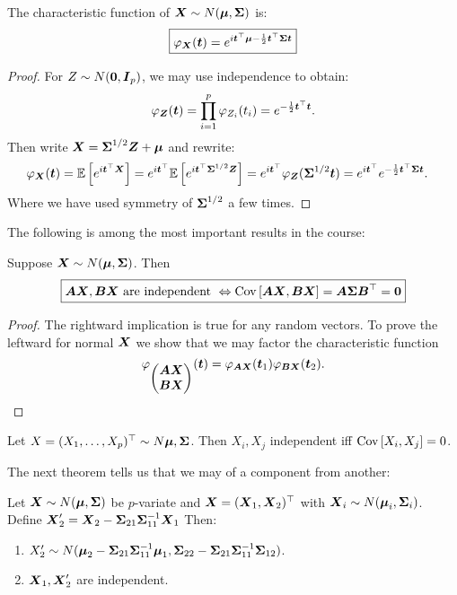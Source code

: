 \begin{theorem}
    The characteristic function of $\X\sim N(\M, \SS)$ is:
    \begin{equation}
        \boxed{\phi_{\X}(\mt) = e^{ i \mt^\top\M - \frac{1}{2}\mt^\top\SS\mt}}
    \end{equation}
\end{theorem}
\begin{proof}
    For $Z\sim N(\zero, \mI_p)$, we may use independence to obtain:
    $$
        \phi_{\Z}(\mt) = \prod_{i=1}^p \phi_{Z_i}(t_i) = e^{-\frac{1}{2} \mt^\top\mt}.
    $$
    Then write $\X=\SS^{1/2} \Z + \M$ and rewrite:
    \begin{align*}
        \phi_{\X}(\mt) 
        &= \ev{e^{i\mt^\top\X}}
        = e^{i\mt^\top}\ev{e^{i\mt^\top\SS^{1/2}\Z}}
        = e^{i\mt^\top}\phi_{\Z}(\SS^{1/2}\mt)
        = e^{i\mt^\top}e^{-\frac{1}{2} \mt^\top\SS\mt}.
    \end{align*}
    Where we have used symmetry of $\SS^{1/2}$ a few times.
\end{proof}
The following is among the most important results in the course:
\begin{theorem}
     Suppose $\X\sim N(\M, \SS)$. Then 
    \begin{equation}
        \boxed{\mA \X, \mB \X \textrm{ are independent } \Leftrightarrow \cov{\mA \X, \mB \X} = \mA\SS\mB^\top = \zero}
    \end{equation} 
\end{theorem}
\begin{proof}
    The rightward implication is true for any random vectors. To prove the leftward for normal $\X$ we show that we may factor the characteristic function 
    $$
    \phi_{\begin{pmatrix}
        \mA \X \\ \mB \X
    \end{pmatrix}} (\mt) 
    = \phi_{\mA\X} (\mt_1) \phi_{\mB\X} (\mt_2).
    $$
\end{proof}
\begin{corollary}
    Let $X = (X_1,\dots,X_p)^\top\sim N{\M, \SS}$. Then $X_i, X_j$ independent iff $\cov{X_i,X_j}=0$.
\end{corollary}
The next theorem tells us that we may  of a component from another:
\begin{theorem}
    Let $\X\sim N(\M, \SS)$ be $p$-variate and $\X=(\X_1,\X_2)^\top$ with $\X_i\sim N(\M_i, \SS_i)$. Define $\X_2' = \X_2 - \SS_{21}\SS_{11}^{-1} \X_1$ Then:
    \begin{enumerate}
        \item $X_2'\sim N(\M_2 - \SS_{21}\SS_{11}^{-1}\M_1, \SS_{22} - \SS_{21}\SS_{11}^{-1}\SS_{12})$.
        \item $\X_1, \X_2'$ are independent.
    \end{enumerate}
\end{theorem}

